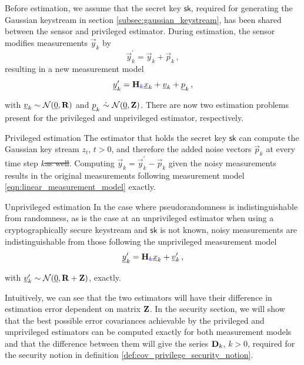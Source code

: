 \documentclass[letterpaper, 10 pt, conference]{ieeeconf}
\providecommand{\DIFadd}[1]{{\protect\color{blue}\uwave{#1}}} %
\providecommand{\DIFdel}[1]{{\protect\color{red}\sout{#1}}}                      %
\providecommand{\DIFaddbegin}{} %
\providecommand{\DIFaddend}{} %
\providecommand{\DIFdelbegin}{} %
\providecommand{\DIFdelend}{} %
\newcommand{\DIFscaledelfig}{0.5}
\newlength{\DIFdelgraphicswidth} %
\newlength{\DIFdelgraphicsheight} %
\newcommand{\DIFaddincludegraphics}[2][]{{\color{blue}\fbox{\DIFOincludegraphics[#1]{#2}}}} %
\newcommand{\DIFdelincludegraphics}[2][]{%
\sbox{\DIFdelgraphicsbox}{\DIFOincludegraphics[#1]{#2}}%
\settoboxwidth{\DIFdelgraphicswidth}{\DIFdelgraphicsbox} %
\settoboxtotalheight{\DIFdelgraphicsheight}{\DIFdelgraphicsbox} %
\scalebox{\DIFscaledelfig}{%
\parbox[b]{\DIFdelgraphicswidth}{\usebox{\DIFdelgraphicsbox}\\[-\baselineskip] \rule{\DIFdelgraphicswidth}{0em}}\llap{\resizebox{\DIFdelgraphicswidth}{\DIFdelgraphicsheight}{%
\setlength{\unitlength}{\DIFdelgraphicswidth}%
\begin{picture}(1,1)%
\thicklines\linethickness{2pt} %
{\color[rgb]{1,0,0}\put(0,0){\framebox(1,1){}}}%
{\color[rgb]{1,0,0}\put(0,0){\line( 1,1){1}}}%
{\color[rgb]{1,0,0}\put(0,1){\line(1,-1){1}}}%
\end{picture}%
}\hspace*{3pt}}} %
} %
\DeclareRobustCommand{\DIFaddbegin}{\DIFOaddbegin \let\includegraphics\DIFaddincludegraphics} %
\DeclareRobustCommand{\DIFaddend}{\DIFOaddend \let\includegraphics\DIFOincludegraphics} %
\DeclareRobustCommand{\DIFdelbegin}{\DIFOdelbegin \let\includegraphics\DIFdelincludegraphics} %
\DeclareRobustCommand{\DIFdelend}{\DIFOaddend \let\includegraphics\DIFOincludegraphics} %
\begin{document}
Before estimation, we assume that the secret key $\mathsf{sk}$, required for generating the Gaussian keystream in section \ref{subsec:gaussian_keystream}, has been shared between the sensor and privileged estimator. During estimation, the sensor modifies measurements $\vec{y}_k$ by
\begin{equation}\label{eqn:modified_measurement}
   \vec{y}^\prime_k = \vec{y}_k + \vec{p}_k\,,
\end{equation}
resulting in a new measurement model
\begin{equation}
   \vec{y}^\prime_k = \mat{H}\DIFaddbegin \DIFadd{_k}\DIFaddend \vec{x}_k + \vec{v}_k + \vec{p}_k\,,
\end{equation}
with \DIFdelbegin \DIFdel{${\underline{v}}_k\sim \mathcal{N}({\underline{0}},{{\mathbf{R}}})$ }\DIFdelend \DIFaddbegin \DIFadd{$\vec{v}_k\sim \mathcal{N}(\vec{0},\mat{R}_k)$ }\DIFaddend and $\vec{p}_k\ \dot{\sim}\ \mathcal{N}(\vec{0},\mat{Z})$. There are now two estimation problems present for the privileged and unprivileged estimator, respectively.
\begin{LaTeXdescription}
   \item[Privileged estimation] The estimator that holds the secret key $\mathsf{sk}$ can compute the Gaussian key stream $z_t$, $t>0$, and therefore the added noise vectors $\vec{p}_k$ at every time step $k$\DIFdelbegin \DIFdel{as well}\DIFdelend . Computing $\vec{y}_k = \vec{y}^\prime_k - \vec{p}_k$ given the noisy measurements results in the original measurements following measurement model \eqref{eqn:linear_measurement_model} exactly.
   \item[Unprivileged estimation] In the case where pseudorandomness is indistinguishable from randomness, as is the case at an unprivileged estimator when using a cryptographically secure keystream and $\mathsf{sk}$ is not known, noisy measurements are indistinguishable from those following the unprivileged measurement model 
   \begin{equation}\label{eqn:unprivileged_measurement_model}
      \vec{y}^\prime_k = \mat{H}\DIFaddbegin \DIFadd{_k}\DIFaddend \vec{x}_k + \vec{v}^\prime_k\,,
   \end{equation}
   with \DIFdelbegin \DIFdel{${\underline{v}}^\prime_k\sim \mathcal{N}({\underline{0}},{{\mathbf{R}}}+{{\mathbf{Z}}})$}\DIFdelend \DIFaddbegin \DIFadd{$\vec{v}^\prime_k\sim \mathcal{N}(\vec{0},\mat{R}_k+\mat{Z})$}\DIFaddend , exactly.
\end{LaTeXdescription}

Intuitively, we can see that the two estimators will have their difference in estimation error dependent on matrix ${{\mathbf{Z}}}$. In the security section, we will show that the best possible error covariances achievable by the privileged and unprivileged estimators can be computed exactly for both measurement models and that the difference between them will give the series ${{\mathbf{D}}}_k$, $k>0$, required for the security notion in definition \ref{def:cov_privilege_security_notion}.
\end{document}
